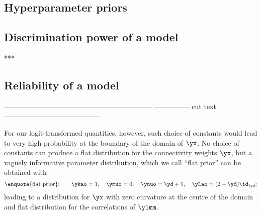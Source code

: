 \subsection{Hyperparameter priors}
\label{sec:hyperparam_priors}

 \citep{leonardetal1992,yangetal1994,pinheiroetal1996,barnardetal2000,eversonetal2000,daniels2006,huangetal2013b,alvarezetal2014,hurtadoruaetal2015}  \citep{gelmanetal1996}





\subsection{Discrimination power of a model}
\label{sec:discrimination}

***

\subsection{Reliability of a model}
\label{sec:reliability}



---------------------------------------------------------------
--------------- cut text -----------------------------------------


For our logit-transformed quantities,
however, such choice of constants would lead to very high probability at
the boundary of the domain of $\yx$. No choice of constants can produce a
flat distribution for the connectivity weights $\yx$, but a vaguely
informative parameter distribution, which we call \enquote{flat prior} can be
obtained with
\begin{equation}
  \label{eq:values_flat_prior}
\text{\enquote{flat prior}:}\qquad  \ykao=1, \quad  \ymuo=0, \quad  \ynuo=\yd+1, \quad  \yLao = (2+\yd)\id_{\yd};
\end{equation}
leading to a distribution for $\yx$ with zero curvature at the centre of the
domain and flat distribution for the correlations of $\ylmm$.





